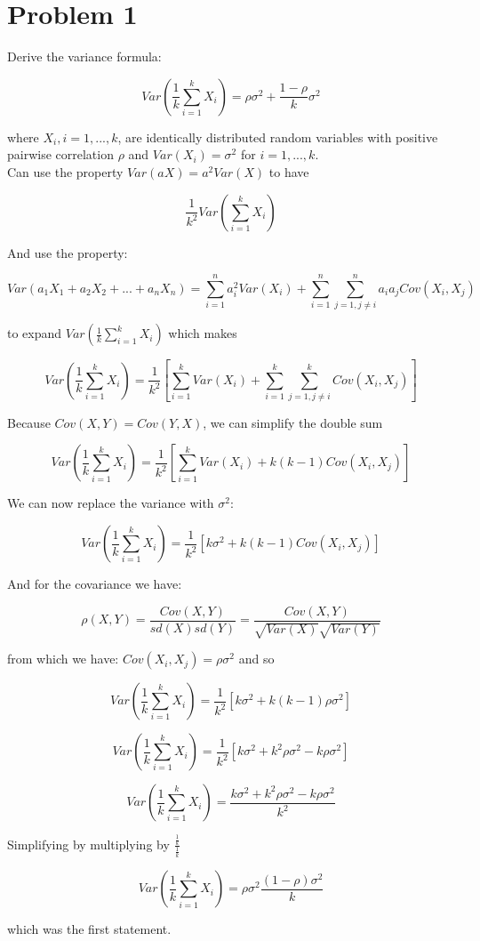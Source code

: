 \section*{Problem 1}

Derive the variance formula: 

\[ Var(\frac{1}{k} \sum\limits_{i=1}^k X_i ) = \rho\sigma^2 + \frac{1 - \rho}{k}\sigma^2 \]

where $X_i , i = 1,...,k$, are identically distributed random variables with positive pairwise correlation $\rho$ and $Var(X_i) = \sigma^2 $ for $ i = 1,...,k$. \\


\noindent Can use the property $Var(aX) = a^2Var(X)$ to have

\[ \frac{1}{k^2}Var(\sum\limits_{i=1}^k X_i) \]


\noindent And use the property: 

\[ Var(a_1X_1 + a_2X_2 + ... + a_nX_n) = \sum_{i=1}^{n} a_i^2Var(X_i) + \sum_{i=1}^{n}\sum_{j=1, j \neq i}^{n}a_i a_j Cov(X_i, X_j) \]

\noindent to expand $Var(\frac{1}{k} \sum_{i=1}^{k} X_i )$ which makes

\[ Var(\frac{1}{k} \sum\limits_{i=1}^k X_i ) = \frac{1}{k^2}[ \sum\limits_{i=1}^kVar(X_i) + \sum\limits_{i=1}^k \sum\limits_{j=1, j \neq i}^k Cov(X_i, X_j)]  \]


\noindent Because $Cov(X,Y) = Cov(Y,X)$, we can simplify the double sum 

\[ Var(\frac{1}{k} \sum\limits_{i=1}^k X_i ) = \frac{1}{k^2}[ \sum\limits_{i=1}^kVar(X_i) + k(k - 1) Cov(X_i, X_j)] \]

\noindent We can now replace the variance with $\sigma^2$:
 
\[ Var(\frac{1}{k} \sum\limits_{i=1}^k X_i ) = \frac{1}{k^2}[ k\sigma^2 + k(k - 1) Cov(X_i, X_j)] \] 


\noindent And for the covariance we have: 

\[ \rho(X,Y) = \frac{Cov(X,Y)}{sd(X) sd(Y)} = \frac{Cov(X,Y)}{\sqrt{Var(X)} \sqrt{Var(Y)}} \]

\noindent from which we have: $Cov(X_i, X_j) = \rho\sigma^2$ and so

\[ Var(\frac{1}{k} \sum\limits_{i=1}^k X_i ) = \frac{1}{k^2}[ k\sigma^2 + k(k - 1)\rho\sigma^2] \]

\[ Var(\frac{1}{k} \sum\limits_{i=1}^k X_i ) = \frac{1}{k^2}[ k\sigma^2 + k^2\rho\sigma^2 - k\rho\sigma^2] \]

\[ Var(\frac{1}{k} \sum\limits_{i=1}^k X_i ) = \frac{k\sigma^2 + k^2\rho\sigma^2 - k\rho\sigma^2}{k^2} \]


\noindent Simplifying by multiplying by $\frac{\frac{1}{k}}{\frac{1}{k}}$

\[ Var(\frac{1}{k} \sum\limits_{i=1}^k X_i ) = \rho\sigma^2 \frac{(1-\rho)\sigma^2}{k} \]

\noindent which was the first statement. 







